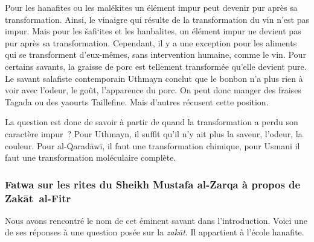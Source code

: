 Pour les hanafites ou les malékites un élément impur peut devenir pur
après sa transformation. Ainsi, le vinaigre qui résulte de la
transformation du vin n'est pas impur. Mais pour les šafi`ites et les
hanbalites, un élément impur ne devient pas pur après sa transformation.
Cependant, il y a une exception pour les aliments qui se transforment
d'eux-mêmes, sans intervention humaine, comme le vin. Pour certains
savants, la graisse de porc est tellement transformée qu'elle devient
pure. Le savant salafiste contemporain Uthmayn conclut que le bonbon n'a
plus rien à voir avec l'odeur, le goût, l'apparence du porc. On peut
donc manger des fraises Tagada ou des yaourts Taillefine. Mais d'autres
récusent cette position.

La question est donc de savoir à partir de quand la transformation a
perdu son caractère impur~? Pour Uthmayn, il suffit qu'il n'y ait plus
la saveur, l'odeur, la couleur. Pour al-Qaradāwī, il faut une
transformation chimique, pour Usmani il faut une transformation
moléculaire complète.

\subsubsection{Fatwa sur les rites du Sheikh Mustafa al-Zarqa à propos de
Zakāt~al-Fitr}

Nous avons rencontré le nom de cet éminent savant dans l'introduction.
Voici une de ses réponses à une question posée sur la \emph{zakāt}. Il
appartient à l'école hanafite.

